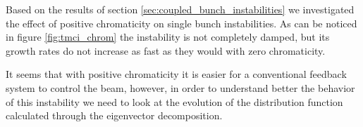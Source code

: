 


Based on the results of section \ref{sec:coupled_bunch_instabilities} we investigated the effect of positive chromaticity on single bunch instabilities. As can be noticed in figure \ref{fig:tmci_chrom} the instability is not completely damped, but its growth rates do not increase as fast as they would with zero chromaticity. 

It seems that with positive chromaticity it is easier for a conventional feedback system to control the beam, however, in order to understand better the behavior of this instability we need to look at the evolution of the distribution function calculated through the eigenvector decomposition.

